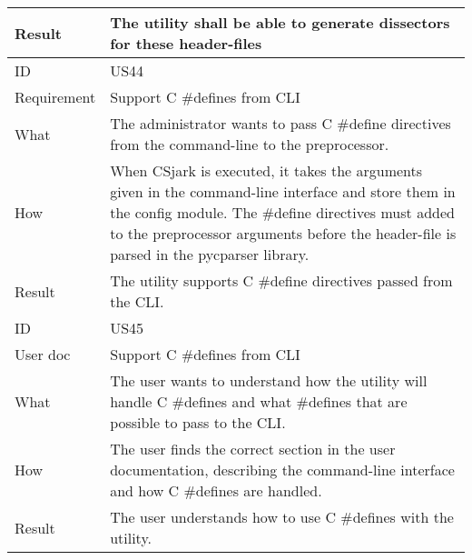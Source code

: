 \begin{table}[htbp]
{\begin{tabularx}{1.2\textwidth}{l X}
	Result & The utility shall be able to generate dissectors for these header-files \\	
	\midrule
	ID & US44 \\
	Requirement & Support C \#defines from CLI  \\
	What & The administrator wants to pass C \#define directives from the command-line to the preprocessor.   \\
	How & When CSjark is executed, it takes the arguments given in the command-line interface and store them in the config module.
	The \#define directives must added to the preprocessor arguments before the header-file is parsed in the pycparser library.   \\
	Result & The utility supports C \#define directives passed from the CLI. \\
	\midrule
	ID & US45 \\
	User doc & Support C \#defines from CLI \\
	What & The user wants to understand how the utility will handle C \#defines and what \#defines that are possible to pass to the CLI.   \\
	How & The user finds the correct section in the user documentation, describing the command-line interface and how C \#defines are handled.  \\
	Result & The user understands how to use C \#defines with the utility. \\
	\bottomrule
\end{tabularx}}
\end{table}

